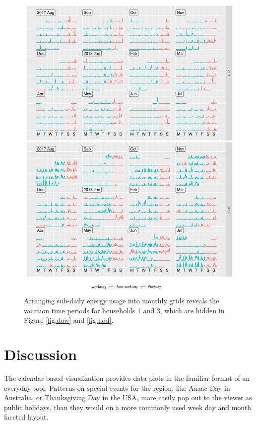 \documentclass[12pt]{article}
\begin{document}
\begin{figure}

{\centering \includegraphics[width=\textwidth]{figure/household13-1} 

}

\caption{Arranging sub-daily energy usage into monthly grids reveals the vacation time periods for households 1 and 3, which are hidden in Figure \ref{fig:dow} and \ref{fig:hod}.}\label{fig:household13}
\end{figure}

\hypertarget{discussion}{%
\section{Discussion}\label{discussion}}

\label{sec:discussion}

The calendar-based visualization provides data plots in the familiar
format of an everyday tool. Patterns on special events for the region,
like Anzac Day in Australia, or Thanksgiving Day in the USA, more easily
pop out to the viewer as public holidays, than they would on a more
commonly used week day and month faceted layout.
\end{document}
